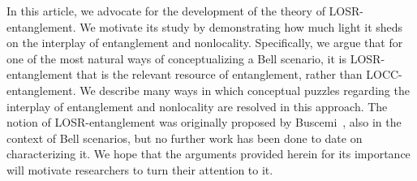 \documentclass[12pt]{article}
\theoremstyle{plain}
\theoremstyle{definition}
\begin{document}
In this article, we advocate for the development of the theory of LOSR-entanglement. 
 We motivate  its study by  demonstrating how much light it sheds on  the interplay of entanglement and nonlocality.  Specifically, we argue that for one of the most natural ways of conceptualizing a Bell scenario,
it is LOSR-entanglement that is the relevant resource of entanglement, rather than LOCC-entanglement.  We describe many ways in which conceptual puzzles regarding the interplay of entanglement and nonlocality are resolved in this approach.   
 The notion of LOSR-entanglement was originally proposed by Buscemi~\cite{Buscemi2012LOSR}, also in the context of Bell scenarios, but no further work has been done to date on characterizing it. We hope that the arguments provided herein for its importance  will motivate researchers to turn their attention to it.
\end{document}
